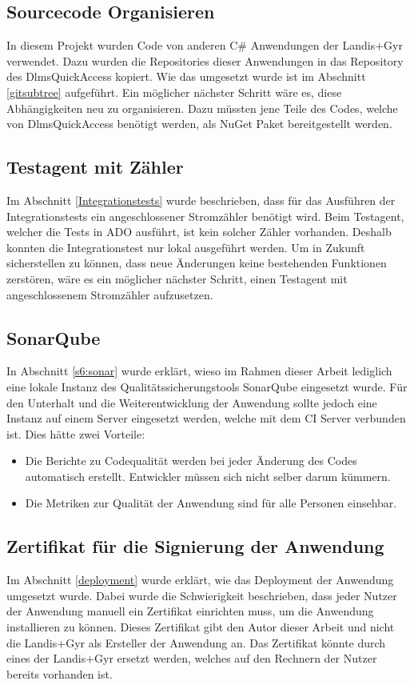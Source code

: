 \subsection{Sourcecode Organisieren}\label{ausblick:ats_split}
In diesem Projekt wurden Code von anderen C\# Anwendungen der Landis+Gyr verwendet.
Dazu wurden die Repositories dieser Anwendungen in das Repository des DlmsQuickAccess kopiert.
Wie das umgesetzt wurde ist im Abschnitt \ref{gitsubtree} aufgeführt.
Ein möglicher nächster Schritt wäre es, diese Abhängigkeiten neu zu organisieren.
Dazu müssten jene Teile des Codes, welche von DlmsQuickAccess benötigt werden, als NuGet Paket bereitgestellt werden.


\subsection{Testagent mit Zähler}
Im Abschnitt \ref{Integrationstests} wurde beschrieben, dass für das Ausführen der Integrationstests ein angeschlossener Stromzähler benötigt wird.
Beim Testagent, welcher die Tests in \ac{ADO} ausführt, ist kein solcher Zähler vorhanden.
Deshalb konnten die Integrationstest nur lokal ausgeführt werden.
Um in Zukunft sicherstellen zu können, dass neue Änderungen keine bestehenden Funktionen zerstören, wäre es ein möglicher nächster Schritt, einen Testagent mit angeschlossenem Stromzähler aufzusetzen.

\subsection{SonarQube}
In Abschnitt \ref{s6:sonar} wurde erklärt, wieso im Rahmen dieser Arbeit lediglich eine lokale Instanz des Qualitätssicherungstools SonarQube eingesetzt wurde.
Für den Unterhalt und die Weiterentwicklung der Anwendung sollte jedoch eine Instanz auf einem Server eingesetzt werden, welche mit dem \ac{CI} Server verbunden ist.
Dies hätte zwei Vorteile:
\begin{itemize}
   \item Die Berichte zu Codequalität werden bei jeder Änderung des Codes automatisch erstellt. 
Entwickler müssen sich nicht selber darum kümmern.
   \item Die Metriken zur Qualität der Anwendung sind für alle Personen einsehbar.
\end{itemize}


\subsection{Zertifikat für die Signierung der Anwendung}\label{ausblick:cert}
Im Abschnitt \ref{deployment} wurde erklärt, wie das Deployment der Anwendung umgesetzt wurde.
Dabei wurde die Schwierigkeit beschrieben, dass jeder Nutzer der Anwendung manuell ein Zertifikat einrichten muss, um die Anwendung installieren zu können.
Dieses Zertifikat gibt den Autor dieser Arbeit und nicht die Landis+Gyr als Ersteller der Anwendung an.
Das Zertifikat könnte durch eines der Landis+Gyr ersetzt werden, welches auf den Rechnern der Nutzer bereits vorhanden ist.


